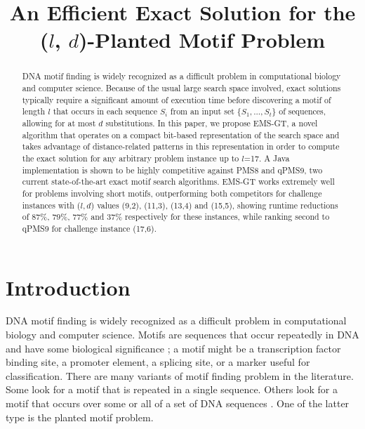 \documentclass[conference]{IEEEtran}
\begin{document}
\title{An Efficient Exact Solution for the ($l$, $d$)-Planted Motif Problem}
\author{
  \and {}
  \and {}
	}
\maketitle

\begin{abstract}\boldmath
	DNA motif finding is widely recognized as a difficult problem in computational biology and computer science. Because of the usual large search space involved, exact solutions typically require a significant amount of execution time before discovering a motif of length $l$ that occurs in each sequence $S_{i}$ from an input set $\{S_{1} ,...,S_{t}\}$ of sequences, allowing for at most $d$ substitutions. In this paper, we propose EMS-GT, a novel algorithm that operates on a compact bit-based representation of the search space and takes advantage of distance-related patterns in this representation in order to compute the exact solution for any arbitrary problem instance up to $l$=17. A Java implementation
	is shown to be highly competitive against PMS8 and qPMS9, two current state-of-the-art exact motif search algorithms. EMS-GT works extremely well for problems involving short motifs, outperforming both competitors for challenge instances with ($l,d$) values (9,2), (11,3), (13,4) and (15,5), showing runtime reductions of 87\%, 79\%, 77\% and 37\% respectively for these instances, while ranking second to qPMS9 for challenge instance (17,6).\newline
\end{abstract}

\section{Introduction}
	DNA motif finding is widely recognized as a difficult problem in computational biology and computer science. Motifs are sequences that occur repeatedly in DNA and have some biological significance \cite{das2007survey}; a motif might be a transcription factor binding site, a promoter element, a splicing site, or a marker useful for classification. There are many variants of motif finding problem in the literature. Some look for a motif that is repeated in a single sequence. Others look for a motif that occurs over some or all of a set of DNA sequences \cite{dasari2010efficient}. One of the latter type is the planted motif problem.
\end{document}
